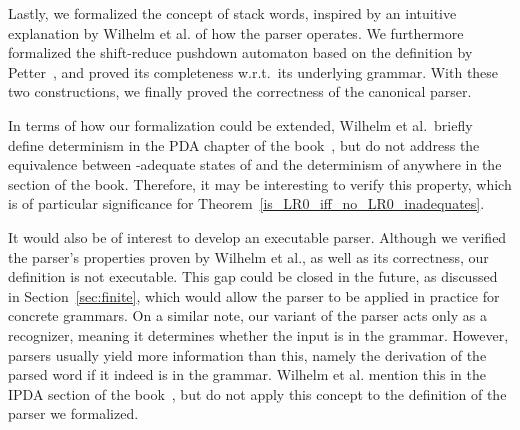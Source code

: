 \begin{isabellebody}
\begin{isamarkuptext}
Lastly, we formalized the concept of stack words, inspired by an intuitive explanation by Wilhelm et
al. of how the parser operates. We furthermore formalized the shift-reduce pushdown automaton
based on the definition by Petter~\cite{Petter}, and proved its completeness w.r.t.\ its underlying
grammar. With these two constructions, we finally proved the correctness of the canonical 
parser.%
\end{isamarkuptext}\isamarkuptrue%
%
\isadelimdocument
%
\endisadelimdocument
%
\isatagdocument
%
\isamarkuptrue%
%
\endisatagdocument
{\isafolddocument}%
%
\isadelimdocument
%
\endisadelimdocument
%
\begin{isamarkuptext}%
In terms of how our formalization could be extended, Wilhelm et al.\ briefly define determinism
in the PDA chapter of the book~\cite[p. 58]{Wilhelm}, but do not address the equivalence between
-adequate states of  and the determinism of  anywhere
in the  section of the book. Therefore, it may be interesting to verify this property, which
is of particular significance for Theorem~\ref{is_LR0_iff_no_LR0_inadequates}.

It would also be of interest to develop an executable  parser.
Although we verified the parser's properties proven by Wilhelm et al., as well as its correctness, 
our definition is not executable. This gap could be closed in the future, as discussed in
Section~\ref{sec:finite}, which would allow the parser to be applied in practice for concrete
grammars. On a similar note, our variant of the parser acts only as a recognizer, meaning it
determines whether the input is in the grammar. However, parsers usually yield more information than
this, namely the derivation of the parsed word if it indeed is in the grammar. Wilhelm et al.
mention this in the IPDA section of the 
book~\cite[p. 63, \textit{Pushdown Automata with Output}]{Wilhelm}, but do not apply this concept to
the definition of the  parser we formalized.


\end{isamarkuptext}
\end{isabellebody}
